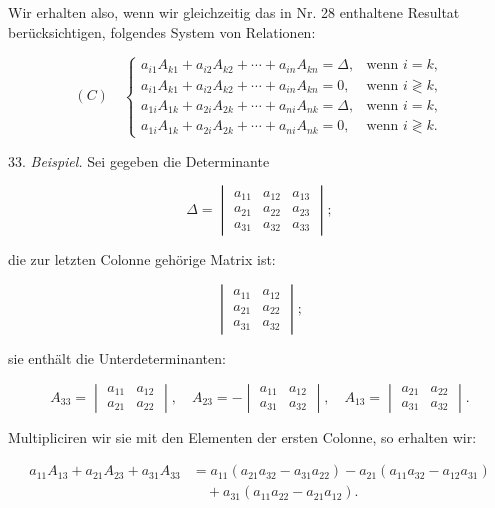 \documentclass[11pt]{article}
\let\Delta\varDelta
\begin{document}
Wir erhalten also, wenn wir gleichzeitig das in Nr. 28 enthaltene
Resultat berücksichtigen, folgendes System von Relationen:

\[
(C)\quad
\begin{cases}
a_{i1}A_{k1}+a_{i2}A_{k2}+\cdots+a_{in}A_{kn}=\Delta, & \text{wenn } i=k,\\
a_{i1}A_{k1}+a_{i2}A_{k2}+\cdots+a_{in}A_{kn}=0, & \text{wenn } i\gtrless k,\\
a_{1i}A_{1k}+a_{2i}A_{2k}+\cdots+a_{ni}A_{nk}=\Delta, & \text{wenn } i=k,\\
a_{1i}A_{1k}+a_{2i}A_{2k}+\cdots+a_{ni}A_{nk}=0, & \text{wenn } i\gtrless k.
\end{cases}
\]

33. \textit{Beispiel.} Sei gegeben die Determinante

\[
\Delta=
\begin{vmatrix}
a_{11} & a_{12} & a_{13} \\
a_{21} & a_{22} & a_{23} \\
a_{31} & a_{32} & a_{33}
\end{vmatrix};
\]

die zur letzten Colonne gehörige Matrix ist:

\[
\begin{vmatrix}
a_{11} & a_{12} \\
a_{21} & a_{22} \\
a_{31} & a_{32}
\end{vmatrix};
\]

sie enthält die Unterdeterminanten:

\[
A_{33}=\begin{vmatrix} a_{11} & a_{12} \\ a_{21} & a_{22} \end{vmatrix},\quad
A_{23}=-\begin{vmatrix} a_{11} & a_{12} \\ a_{31} & a_{32} \end{vmatrix},\quad
A_{13}=\begin{vmatrix} a_{21} & a_{22} \\ a_{31} & a_{32} \end{vmatrix}.
\]

Multipliciren wir sie mit den Elementen der ersten Colonne, so erhalten
wir:

\[
\begin{aligned}
a_{11}A_{13}+a_{21}A_{23}+a_{31}A_{33} &= a_{11}(a_{21}a_{32}-a_{31}a_{22})-a_{21}(a_{11}a_{32}-a_{12}a_{31})\\
&\quad{}+a_{31}(a_{11}a_{22}-a_{21}a_{12}).
\end{aligned}
\]
\end{document}
